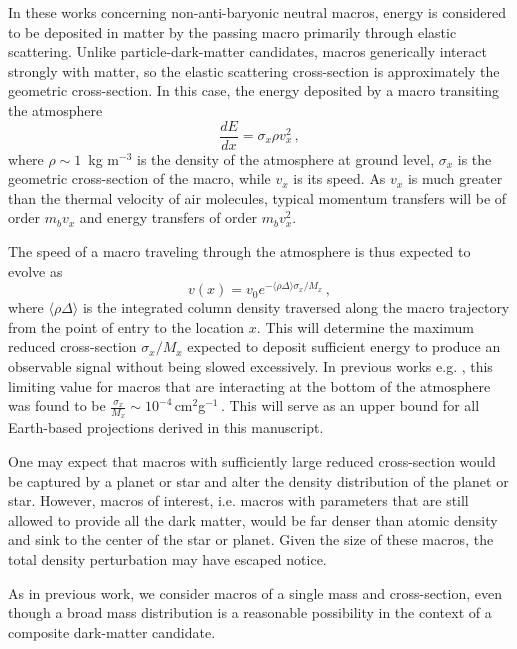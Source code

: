 \documentclass[%
 reprint,
 amsmath,amssymb,
 aps,
]{revtex4-2}
\newcommand{\vtwo}[1]{{\color{red} #1}}
\begin{document}
    In these works concerning non-anti-baryonic neutral macros, energy is considered to be deposited in matter by the passing macro primarily through elastic scattering. \vtwo{Unlike particle-dark-matter candidates, macros generically interact strongly with matter, so the elastic scattering cross-section is approximately the geometric cross-section.} In this case, the energy deposited by a macro transiting the atmosphere 
    \begin{equation}\label{eq:dedx}
        \frac{dE}{dx} = \sigma_x \rho v_x^2\,,
    \end{equation}
    where $\rho \sim 1\,$ kg m$^{-3}$ is the density of the atmosphere at ground level, $\sigma_x$ is the \vtwo{geometric} cross-section of the macro, while $v_x$ is its speed. \vtwo{As $v_x$ is much greater than the thermal velocity of air molecules, typical momentum transfers will be of order $m_b v_{x}$ and energy transfers of order $m_b v_{x}^2$.}

    The speed of a macro traveling through the atmosphere is thus expected to evolve as
    \begin{equation}\label{eq:atmo_velocity}
        v(x) = v_{0} e^{-\langle \rho \Delta\rangle \sigma_x/{M_x}}\,,
    \end{equation}
    where $\langle \rho \Delta\rangle$ is the integrated column density traversed along the macro trajectory from the point of entry to the location $x$. This will determine the maximum reduced cross-section $\sigma_x/M_x$ expected to deposit sufficient energy to produce an observable signal without being slowed excessively. In previous works e.g. \vtwo{\citet{Sidhu2019death, Sidhu2019bolide}}, this limiting value for macros that are interacting at the bottom of the atmosphere was found to be $\frac{\sigma_x}{M_x} \sim 10^{-4}\,$cm$^2$g$^{-1}\,$. This will serve as an upper bound for all Earth-based projections derived in this manuscript.

    \vtwo{One may expect that macros with sufficiently large reduced cross-section would be captured by a planet or star and alter the density distribution of the planet or star. However, macros of interest, i.e. macros with parameters that are still allowed to provide all the dark matter, would be far denser than atomic density and sink to the center of the star or planet. Given the size of these macros, the total density perturbation may have escaped notice.}

    As in previous work, we consider macros of a single mass and cross-section, even though a broad mass distribution is a reasonable possibility in the context of a composite dark-matter candidate.
\end{document}
